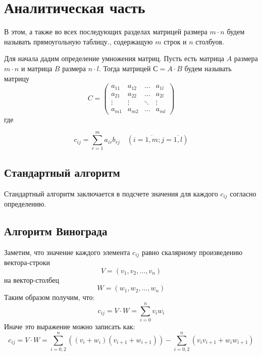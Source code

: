 \chapter{Аналитическая часть}

В этом, а также во всех последующих разделах матрицей размера $m \cdot n$ будем называть прямоугольную таблицу., содержащую $m$ строк и $n$ столбуов.

Для начала дадим определение умножения матриц. Пусть есть матрица $A$ размера  $m \cdot n$ и матрица $B$ размера $n \cdot l$. Тогда матрицей $С = A \cdot B$ будем называть матрицу 
$$C = \begin{pmatrix}
	a_{11} & a_{12} & \ldots & a_{1l}\\
	a_{21} & a_{22} & \ldots & a_{2l}\\
	\vdots & \vdots & \ddots & \vdots\\
	a_{m1} & a_{m2} & \ldots & a_{ml}
\end{pmatrix}$$
где

$$ 
c_{ij} = \sum_{r=1}^{m} a_{ir}b_{rj} \quad (i=\overline{1,m}; j=\overline{1,l}) $$

\section{Стандартный алгоритм}


Стандартный алгоритм заключается в подсчете  значения для каждого $c_{ij}$ согласно определению.


\section{Алгоритм Винограда}

Заметим, что значение каждого элемента $c_{ij}$ равно скалярному произведению вектора-строки 
\begin{equation}
	V = (v_1, v_2, \ldots, v_n)
\end{equation}
на вектор-столбец
\begin{equation}
	W = (w_1, w_2, \ldots, w_n)
\end{equation}
Таким образом получим, что:
\begin{equation}
	c_{ij} = V \cdot W = \sum_{i=0}^{n} v_iw_i
\end{equation}
Иначе это выражение можно записать как:
\begin{equation}
	\label{eq:sum_1}
	c_{ij} = V \cdot W = \sum_{i=0, 2}^{n} ((v_i + w_i)(v_{i+1} + w_{i+1})) - \sum_{i=0, 2}^{n} (v_{i}v_{i+1} + w_{i}w_{i+1})
\end{equation}

